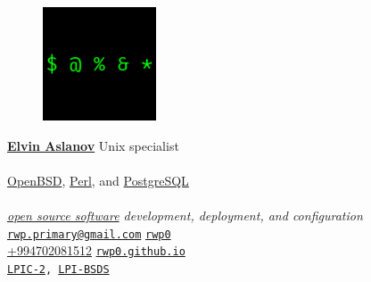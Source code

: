 \documentclass[10pt, oneside, final]{article}
\begin{document}
  \thispagestyle{empty}
  \begin{figure}
  \includegraphics[width = 0.3\textwidth]{business_card.png}
  \end{figure}
  \underline{\large\textsf{\textbf{Elvin Aslanov}}}
  {Unix specialist} \\
  \\
  {\href{https://openbsd.org/}{OpenBSD}, \href{https://perl.org/}{Perl}, and \href{https://postgresql.org/}{PostgreSQL}} \\
  \\
  \emph{\href{https://en.wikipedia.org/wiki/Open-source_software}{open source software} development, deployment, and configuration}
  \vfill 
  {\faEnvelope} \texttt{\href{mailto:rwp.primary@gmail.com}{rwp.primary@gmail.com}} \hfill 
  {\faGithub} \texttt{\href{https://github.com/rwp0}{rwp0}} \\
  {\faPhone} \href{tel:+994702081512}{+994{\textendash}70{\textendash}208{\textendash}15{\textendash}12}
 \hfill
  {\faGlobe} \texttt{\href{https://rwp0.github.io/}{rwp0.github.io}} \\
  {\faCertificate} \texttt{\href{https://cs.lpi.org/caf/Xamman/certification/verify/LPI000307519/bafrejwgeb}{LPIC-2}, \href{https://cs.lpi.org/caf/Xamman/certification/verify/LPI000307519/mvuk2szhhw}{LPI-BSDS}}
\end{document}
